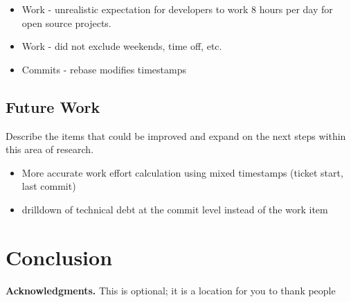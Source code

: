 \documentclass{mpaper}
\begin{document}
\begin{itemize}
  \item Work - unrealistic expectation for developers to work 8 hours per day
  for open source projects.
  \item Work - did not exclude weekends, time off, etc.
  \item Commits - rebase modifies timestamps
\end{itemize}

\subsection{Future Work}
\label{future-work}

Describe the items that could be improved and expand on the next steps within
this area of research.

\begin{itemize}
  \item More accurate work effort calculation using mixed timestamps (ticket start, last commit)
  \item drilldown of technical debt at the commit level instead of the work item
\end{itemize}

\section{Conclusion}
\label{conclusion}

{\bf Acknowledgments.} This is optional; it is a location for you to thank
people



\end{document}
